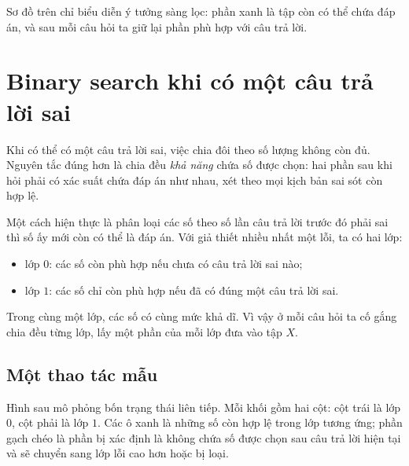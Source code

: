 \documentclass[11pt]{article}
\begin{document}
Sơ đồ trên chỉ biểu diễn ý tưởng sàng lọc: phần xanh là tập còn có thể chứa
đáp án, và sau mỗi câu hỏi ta giữ lại phần phù hợp với câu trả lời.

\section{Binary search khi có một câu trả lời sai}

Khi có thể có một câu trả lời sai, việc chia đôi theo số lượng không còn đủ.
Nguyên tắc đúng hơn là chia đều \emph{khả năng} chứa số được chọn: hai phần
sau khi hỏi phải có xác suất chứa đáp án như nhau, xét theo mọi kịch bản sai
sót còn hợp lệ.

Một cách hiện thực là phân loại các số theo số lần câu trả lời trước đó phải
sai thì số ấy mới còn có thể là đáp án. Với giả thiết nhiều nhất một lỗi, ta
có hai lớp:
\begin{itemize}
  \item lớp \(0\): các số còn phù hợp nếu chưa có câu trả lời sai nào;
  \item lớp \(1\): các số chỉ còn phù hợp nếu đã có đúng một câu trả lời sai.
\end{itemize}
Trong cùng một lớp, các số có cùng mức khả dĩ. Vì vậy ở mỗi câu hỏi ta cố
gắng chia đều từng lớp, lấy một phần của mỗi lớp đưa vào tập \(X\).

\subsection{Một thao tác mẫu}

Hình sau mô phỏng bốn trạng thái liên tiếp. Mỗi khối gồm hai cột: cột trái là
lớp \(0\), cột phải là lớp \(1\). Các ô xanh là những số còn hợp lệ trong lớp
tương ứng; phần gạch chéo là phần bị xác định là không chứa số được chọn sau
câu trả lời hiện tại và sẽ chuyển sang lớp lỗi cao hơn hoặc bị loại.
\end{document}
